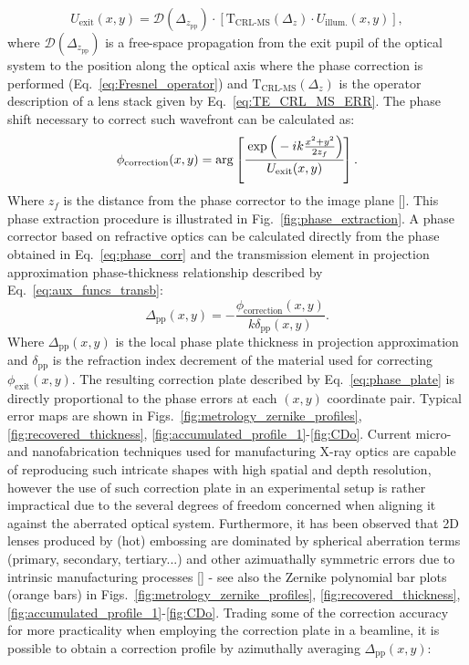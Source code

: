 \begin{refsection}
\begin{equation}\label{eq:U_exit}
    U_{\text{exit}}(x,y) =   \mathcal{D}(\Delta_{z_\text{pp}})\cdot\left[\mathrm{T}_{\text{CRL-MS}}(\Delta_z) \cdot U_{\text{illum.}}(x,y)\right],
\end{equation}
where $\mathcal{D}(\Delta_{z_\text{pp}})$ is a free-space propagation from the exit pupil of the optical system to the position along the optical axis where the phase correction is performed (Eq.~\ref{eq:Fresnel_operator}) and $\mathrm{T}_{\text{CRL-MS}}(\Delta_z)$ is the operator description of a lens stack given by Eq.~\ref{eq:TE_CRL_MS_ERR}. The phase shift necessary to correct such wavefront can be calculated as:
\begin{equation}\label{eq:phase_corr}
   \phi_{\text{correction}}(x,y) = \arg\left[\cfrac{\exp{\Big(-ik\frac{x^2 + y^2}{2z_f}\Big)}}{U_{\text{exit}}(x,y)}\right].
\end{equation}
Where $z_f$ is the distance from the phase corrector to the image plane [\cite{Seiboth2017}]. This phase extraction procedure is illustrated in Fig.~\ref{fig:phase_extraction}. A phase corrector based on refractive optics can be calculated directly from the phase obtained in Eq.~\ref{eq:phase_corr} and the transmission element in projection approximation phase-thickness relationship described by Eq.~\ref{eq:aux_funcs_transb}:
\begin{equation}\label{eq:phase_plate}
   \Delta_\text{pp}(x,y)=-\frac{\phi_{\text{correction}}(x,y)}{k\delta_\text{pp}(x,y)}.
\end{equation}
Where $\Delta_\text{pp}(x,y)$ is the local phase plate thickness in projection approximation and $\delta_\text{pp}$ is the refraction index decrement of the material used for correcting $ \phi_{\text{exit}}(x,y)$. The resulting correction plate described by Eq.~\ref{eq:phase_plate} is directly proportional to the phase errors at each $(x,y)$ coordinate pair. Typical error maps are shown in Figs.~\ref{fig:metrology_zernike_profiles}, \ref{fig:recovered_thickness}, \ref{fig:accumulated_profile_1}-\ref{fig:CDo}. Current micro- and nanofabrication techniques used for manufacturing X-ray optics are capable of reproducing such intricate shapes with high spatial and depth resolution, however the use of such correction plate in an experimental setup is rather impractical due to the several degrees of freedom concerned when aligning it against the aberrated optical system. Furthermore, it has been observed that 2D lenses produced by (hot) embossing are dominated by spherical aberration terms (primary, secondary, tertiary...) and other azimuathally symmetric errors due to intrinsic manufacturing processes [\cite{Schropp2013, Uhlen2014, Seiboth2016, Seiboth2017, Celestre2020, Seiboth2020}] -  see also the Zernike polynomial bar plots (orange bars) in Figs.~\ref{fig:metrology_zernike_profiles}, \ref{fig:recovered_thickness}, \ref{fig:accumulated_profile_1}-\ref{fig:CDo}. Trading some of the correction accuracy for more practicality when employing the correction plate in a beamline, it is possible to obtain a correction profile by azimuthally averaging $\Delta_\text{pp}(x,y)$:

\end{refsection}
